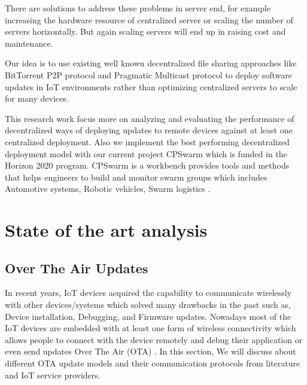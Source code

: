 \documentclass[12pt]{article}
\begin{document}
There are solutions to address these problems in server end, for example increasing the hardware resource of centralized server or scaling the number of servers horizontally. But again scaling servers will end up in raising cost and maintenance.

Our idea is to use existing well known decentralized file sharing approaches like BitTorrent P2P protocol and Pragmatic Multicast protocol to deploy software updates in IoT environments rather than optimizing centralized servers to scale for many devices.


\newpage

This research work focus more on analyzing and evaluating the performance of decentralized ways of deploying updates to remote devices against at least one centralized deployment. Also we implement the best performing decentralized deployment model with our current project  CPSwarm which is funded in the Horizon 2020 program. CPSwarm is a workbench provides tools and methods that helps engineers to build and monitor swarm groups which includes Automotive systems, Robotic vehicles, Swarm logistics \cite{misc11}.

\section{State of the art analysis}

\subsection{Over The Air Updates}

In recent years, IoT devices acquired the capability to communicate wirelessly with other devices/systems which solved many drawbacks in the past such as, Device installation, Debugging, and Firmware updates. Nowadays most of the IoT devices are embedded with at least one form of wireless connectivity which allows people to connect with the device remotely and debug their application or even send updates Over The Air (OTA) \cite{moorits}. In this section, We will discuss about different OTA update models and their communication protocols from literature and IoT service providers.
\end{document}

